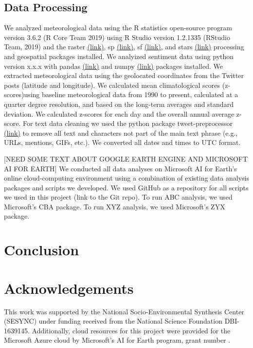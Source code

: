 \documentclass{article}
\begin{document}
\subsection{Data Processing}
We analyzed meteorological data using the R statistics open-source program version 3.6.2  (R Core Team 2019) using R Studio version 1.2.1335 (RStudio Team, 2019) and the raster \href{https://www.rdocumentation.org/packages/raster/versions/3.3-13}{(link)}, sp \href{https://cran.r-project.org/web/packages/sp/index.html}{(link)}, sf \href{https://cran.r-project.org/web/packages/sf/index.html}{(link)}, and stars \href{https://cran.r-project.org/web/packages/stars/index.html}{(link)} processing and geospatial packages installed. We analyized sentiment data using python version x.x.x with pandas \href{https://pandas.pydata.org/}{(link)} and numpy \href{https://numpy.org/}{(link)} packages installed. We extracted meteorological data using the geolocated coordinates from the Twitter posts (latitude and longitude). We calculated mean climatological scores (z-scores)using baseline meteorological data from 1990 to present, calculated at a quarter degree resolution, and based on the long-term averages and standard deviation. We calculated z-scores for each day and the overall annual average z-score. For text data cleaning we used the python package tweet-preprocessor \href{https://pypi.org/project/tweet-preprocessor/}{(link)} to remove all text and characters not part of the main text phrase (e.g., URLs, mentions, GIFs, etc.). We converted all dates and times to UTC format.

[NEED SOME TEXT ABOUT GOOGLE EARTH ENGINE AND MICROSOFT AI FOR EARTH] We conducted all data analyses on Microsoft AI for Earth's online cloud-computing environment using a combination of existing data analysis packages and scripts we developed. We used GitHub as a repository for all scripts we used in this project (link to the Git repo). To run ABC analysis, we used Microsoft's CBA package. To run XYZ analysis, we used Microsoft's ZYX package. 
\section{Conclusion}

\section{Acknowledgements}
This work was supported by the National Socio-Environmental Synthesis Center (SESYNC) under funding received from the National Science Foundation DBI-1639145.  Additionally, cloud resources for this project were provided for the Microsoft Azure cloud by Microsoft's AI for Earth program, grant number .

\printbibliography
\end{document}
